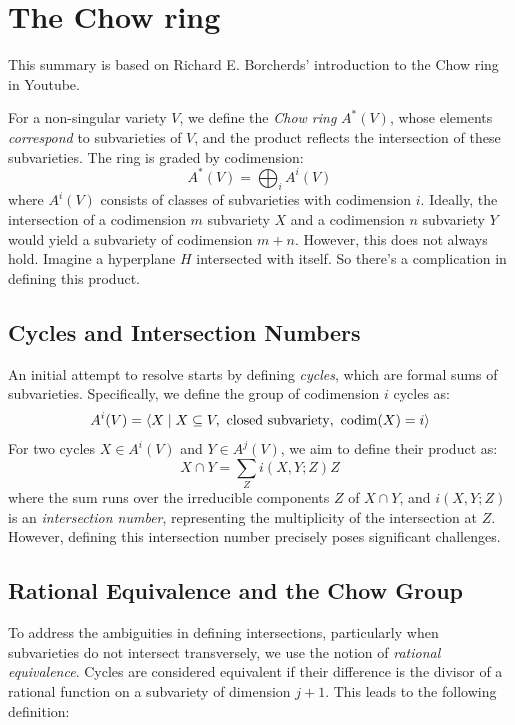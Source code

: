 \documentclass[12pt]{memoir}
\begin{document}
\section{The Chow ring}

This summary is based on Richard E. Borcherds' introduction to the Chow ring in Youtube.

For a non-singular variety \( V \), we define the \emph{Chow ring} \( A^\ast(V) \), whose elements \emph{correspond} to subvarieties of \( V \), and the product reflects the intersection of these subvarieties. The ring is graded by codimension:
\[A^\ast(V) = \bigoplus_i A^i(V)\]
where \( A^i(V) \) consists of classes of subvarieties with codimension \( i \). Ideally, the intersection of a codimension \( m \) subvariety \( X \) and a codimension \( n \) subvariety \( Y \) would yield a subvariety of codimension \( m+n \). However, this does not always hold. Imagine a hyperplane \(H\) intersected with itself. So there's a complication in defining this product.

\subsection{Cycles and Intersection Numbers}

An initial attempt to resolve starts by defining \emph{cycles}, which are formal sums of subvarieties. Specifically, we define the group of codimension \( i \) cycles as:
\[A^i(V) = \left\langle X \mid X \subseteq V, \ \text{closed subvariety}, \ \codim(X) = i \right\rangle\]
For two cycles \( X \in A^i(V) \) and \( Y \in A^j(V) \), we aim to define their product as:
\[X \cap Y = \sum_{Z} i(X, Y; Z) Z\]
where the sum runs over the irreducible components \( Z\) of \( X \cap Y \), and \( i(X, Y; Z) \) is an \emph{intersection number}, representing the multiplicity of the intersection at \( Z \). However, defining this intersection number precisely poses significant challenges.

\subsection{Rational Equivalence and the Chow Group}

To address the ambiguities in defining intersections, particularly when subvarieties do not intersect transversely, we use the notion of \emph{rational equivalence}. Cycles are considered equivalent if their difference is the divisor of a rational function on a subvariety of dimension \( j+1 \). This leads to the following definition:
\end{document}
